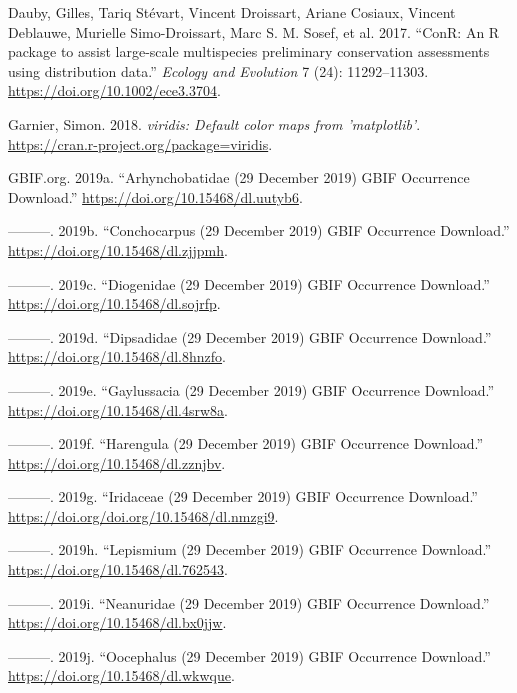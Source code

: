 \documentclass[fleqn,10pt,lineno]{wlpeerj} %
\begin{document}
\leavevmode\hypertarget{ref-Dauby2017}{}%
Dauby, Gilles, Tariq Stévart, Vincent Droissart, Ariane Cosiaux, Vincent Deblauwe, Murielle Simo-Droissart, Marc S. M. Sosef, et al. 2017. ``ConR: An R package to assist large-scale multispecies preliminary conservation assessments using distribution data.'' \emph{Ecology and Evolution} 7 (24): 11292--11303. \url{https://doi.org/10.1002/ece3.3704}.

\leavevmode\hypertarget{ref-Garnier2018}{}%
Garnier, Simon. 2018. \emph{viridis: Default color maps from 'matplotlib'}. \url{https://cran.r-project.org/package=viridis}.

\leavevmode\hypertarget{ref-GBIForg2019c}{}%
GBIF.org. 2019a. ``Arhynchobatidae (29 December 2019) GBIF Occurrence Download.'' \url{https://doi.org/10.15468/dl.uutyb6}.

\leavevmode\hypertarget{ref-GBIForg2019f}{}%
---------. 2019b. ``Conchocarpus (29 December 2019) GBIF Occurrence Download.'' \url{https://doi.org/10.15468/dl.zjjpmh}.

\leavevmode\hypertarget{ref-GBIForg2019}{}%
---------. 2019c. ``Diogenidae (29 December 2019) GBIF Occurrence Download.'' \url{https://doi.org/10.15468/dl.sojrfp}.

\leavevmode\hypertarget{ref-GBIForg2019d}{}%
---------. 2019d. ``Dipsadidae (29 December 2019) GBIF Occurrence Download.'' \url{https://doi.org/10.15468/dl.8hnzfo}.

\leavevmode\hypertarget{ref-GBIForg2019g}{}%
---------. 2019e. ``Gaylussacia (29 December 2019) GBIF Occurrence Download.'' \url{https://doi.org/10.15468/dl.4srw8a}.

\leavevmode\hypertarget{ref-GBIForg2019e}{}%
---------. 2019f. ``Harengula (29 December 2019) GBIF Occurrence Download.'' \url{https://doi.org/10.15468/dl.zznjbv}.

\leavevmode\hypertarget{ref-GBIForg2019j}{}%
---------. 2019g. ``Iridaceae (29 December 2019) GBIF Occurrence Download.'' \url{https://doi.org/doi.org/10.15468/dl.nmzgi9}.

\leavevmode\hypertarget{ref-GBIForg2019i}{}%
---------. 2019h. ``Lepismium (29 December 2019) GBIF Occurrence Download.'' \url{https://doi.org/10.15468/dl.762543}.

\leavevmode\hypertarget{ref-GBIForg2019a}{}%
---------. 2019i. ``Neanuridae (29 December 2019) GBIF Occurrence Download.'' \url{https://doi.org/10.15468/dl.bx0jjw}.

\leavevmode\hypertarget{ref-GBIForg2019n}{}%
---------. 2019j. ``Oocephalus (29 December 2019) GBIF Occurrence Download.'' \url{https://doi.org/10.15468/dl.wkwque}.
\end{document}
